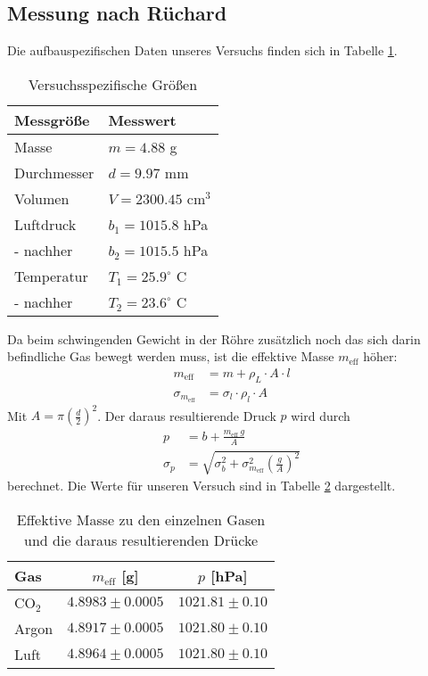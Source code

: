 \documentclass[12pt,a4paper,titlepage,headinclude,bibtotoc]{scrartcl}
\begin{document}
\subsection{Messung nach Rüchard}
Die aufbauspezifischen Daten unseres Versuchs finden sich in Tabelle \ref{tab:versgr}.
\begin{table}[!h]
	\centering
	\begin{tabular}{|l|l|}
		\hline
		Messgröße	& Messwert\\\hline\hline
		Masse		& $m=4.88$ g\\\hline
		Durchmesser	& $d=9.97$ mm\\\hline
		Volumen		& $V=2300.45$ cm$^3$\\\hline
		Luftdruck	& $b_1=1015.8$ hPa\\
		- nachher	& $b_2=1015.5$ hPa\\\hline
		Temperatur	& $T_1=25.9^\circ$ C\\
		- nachher	& $T_2=23.6^\circ$ C\\\hline
	\end{tabular}
	\caption{Versuchsspezifische Größen}
	\label{tab:versgr}
\end{table}
Da beim schwingenden Gewicht in der Röhre zusätzlich noch das sich darin befindliche Gas bewegt werden muss, ist die effektive Masse $m_\text{eff}$ höher:
\begin{align*}
	m_\text{eff}&=m+\rho_L \cdot A\cdot l\\
	\sigma_{m_\text{eff}}&=\sigma_l\cdot \rho_l \cdot A
\end{align*}
Mit $A=\pi \left( \frac{d}{2} \right)^2$. Der daraus resultierende Druck $p$ wird durch
\begin{align*}
	p&=b+\frac{m_\text{eff}~g}{A}\\
	\sigma_p&=\sqrt{\sigma_b^2+\sigma_{m_\text{eff}}^2\left(\frac{g}{A}\right)^2}
\end{align*}
berechnet.
Die Werte für unseren Versuch sind in Tabelle \ref{tab:effm} dargestellt.
\begin{table}[!htbp]
	\centering
	\begin{tabular}{|l|c|c|}
		\hline
		Gas	& $m_\text{eff}$ [g]	& $p$ [hPa]\\\hline\hline
		CO$_2$	& $4.8983 \pm 0.0005$ 	& $1021.81 \pm 0.10$ \\\hline
		Argon	& $4.8917 \pm 0.0005$ 	& $1021.80 \pm 0.10$ \\\hline
		Luft	& $4.8964 \pm 0.0005$ 	& $1021.80 \pm 0.10$ \\\hline
	\end{tabular}
	\caption{Effektive Masse zu den einzelnen Gasen und die daraus resultierenden Drücke} 
	\label{tab:effm}
\end{table}
\end{document}
